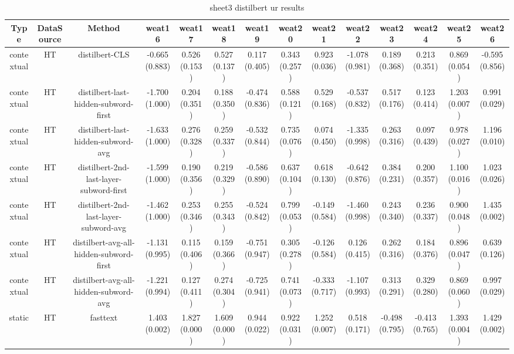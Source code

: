 \begin{sidewaystable}[htb]
    \centering
    \caption{sheet3 distilbert ur results}
    \label{appendix_tab:sheet3_distilbert_ur_results}
    \small
    \begin{tabular}{@{}cccccccccccccc@{}}
        \toprule
        Type & DataSource & Method & weat16 & weat17 & weat18 & weat19 & weat20 & weat21 & weat22 & weat23 & weat24 & weat25 & weat26 \\
        \midrule
        contextual & HT & distilbert-CLS & -0.665 (0.883) & 0.526 (0.153) & 0.527 (0.137) & 0.117 (0.405) & 0.343 (0.257) & 0.923 (0.036) & -1.078 (0.981) & 0.189 (0.368) & 0.213 (0.351) & 0.869 (0.054) & -0.595 (0.856) \\
        contextual & HT & distilbert-last-hidden-subword-first & -1.700 (1.000) & 0.204 (0.351) & 0.188 (0.350) & -0.474 (0.836) & 0.588 (0.121) & 0.529 (0.168) & -0.537 (0.832) & 0.517 (0.176) & 0.123 (0.414) & 1.203 (0.007) & 0.991 (0.029) \\
        contextual & HT & distilbert-last-hidden-subword-avg & -1.633 (1.000) & 0.276 (0.328) & 0.259 (0.337) & -0.532 (0.844) & 0.735 (0.076) & 0.074 (0.450) & -1.335 (0.998) & 0.263 (0.316) & 0.097 (0.439) & 0.978 (0.027) & 1.196 (0.010) \\
        contextual & HT & distilbert-2nd-last-layer-subword-first & -1.599 (1.000) & 0.190 (0.356) & 0.219 (0.329) & -0.586 (0.890) & 0.637 (0.104) & 0.618 (0.130) & -0.642 (0.876) & 0.384 (0.231) & 0.200 (0.357) & 1.100 (0.016) & 1.023 (0.026) \\
        contextual & HT & distilbert-2nd-last-layer-subword-avg & -1.462 (1.000) & 0.253 (0.346) & 0.255 (0.343) & -0.524 (0.842) & 0.799 (0.053) & -0.149 (0.584) & -1.460 (0.998) & 0.243 (0.340) & 0.236 (0.337) & 0.900 (0.048) & 1.435 (0.002) \\
        contextual & HT & distilbert-avg-all-hidden-subword-first & -1.131 (0.995) & 0.115 (0.406) & 0.159 (0.366) & -0.751 (0.947) & 0.305 (0.278) & -0.126 (0.584) & 0.126 (0.415) & 0.262 (0.316) & 0.184 (0.376) & 0.896 (0.047) & 0.639 (0.126) \\
        contextual & HT & distilbert-avg-all-hidden-subword-avg & -1.221 (0.994) & 0.127 (0.411) & 0.274 (0.304) & -0.725 (0.941) & 0.741 (0.073) & -0.333 (0.717) & -1.107 (0.993) & 0.313 (0.291) & 0.329 (0.280) & 0.869 (0.060) & 0.997 (0.029) \\
        static & HT & fasttext & 1.403 (0.002) & 1.827 (0.000) & 1.609 (0.000) & 0.944 (0.022) & 0.922 (0.031) & 1.252 (0.007) & 0.518 (0.171) & -0.498 (0.795) & -0.413 (0.765) & 1.393 (0.004) & 1.429 (0.002) \\

\end{tabular}
\end{sidewaystable}
